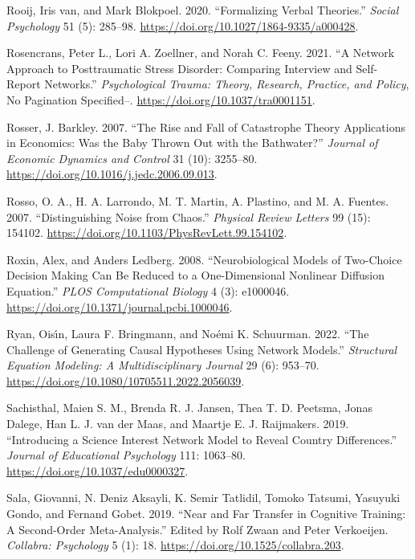 \documentclass[
  a4paper,
  DIV=11,
  numbers=noendperiod,
  oneside]{scrreprt}
\newlength{\cslhangindent}
\newenvironment{CSLReferences}[2] %
 {\begin{list}{}{%
  \setlength{\itemindent}{0pt}
  \setlength{\leftmargin}{0pt}
  \setlength{\parsep}{0pt}
  \ifodd #1
   \setlength{\leftmargin}{\cslhangindent}
   \setlength{\itemindent}{-1\cslhangindent}
  \fi
  \setlength{\itemsep}{#2\baselineskip}}}
 {\end{list}}
\begin{document}
\begin{CSLReferences}{1}{0}
Rooij, Iris van, and Mark Blokpoel. 2020. {``Formalizing Verbal
Theories.''} \emph{Social Psychology} 51 (5): 285--98.
\url{https://doi.org/10.1027/1864-9335/a000428}.

Rosencrans, Peter L., Lori A. Zoellner, and Norah C. Feeny. 2021. {``A
Network Approach to Posttraumatic Stress Disorder: {Comparing} Interview
and Self-Report Networks.''} \emph{Psychological Trauma: Theory,
Research, Practice, and Policy}, No Pagination Specified--.
\url{https://doi.org/10.1037/tra0001151}.

Rosser, J. Barkley. 2007. {``The Rise and Fall of Catastrophe Theory
Applications in Economics: {Was} the Baby Thrown Out with the
Bathwater?''} \emph{Journal of Economic Dynamics and Control} 31 (10):
3255--80. \url{https://doi.org/10.1016/j.jedc.2006.09.013}.

Rosso, O. A., H. A. Larrondo, M. T. Martin, A. Plastino, and M. A.
Fuentes. 2007. {``Distinguishing Noise from Chaos.''} \emph{Physical
Review Letters} 99 (15): 154102.
\url{https://doi.org/10.1103/PhysRevLett.99.154102}.

Roxin, Alex, and Anders Ledberg. 2008. {``Neurobiological {Models} of
{Two-Choice Decision Making Can Be Reduced} to a {One-Dimensional
Nonlinear Diffusion Equation}.''} \emph{PLOS Computational Biology} 4
(3): e1000046. \url{https://doi.org/10.1371/journal.pcbi.1000046}.

Ryan, Oisı́n, Laura F. Bringmann, and Noémi K. Schuurman. 2022. {``The
{Challenge} of {Generating Causal Hypotheses Using Network Models}.''}
\emph{Structural Equation Modeling: A Multidisciplinary Journal} 29 (6):
953--70. \url{https://doi.org/10.1080/10705511.2022.2056039}.

Sachisthal, Maien S. M., Brenda R. J. Jansen, Thea T. D. Peetsma, Jonas
Dalege, Han L. J. van der Maas, and Maartje E. J. Raijmakers. 2019.
{``Introducing a Science Interest Network Model to Reveal Country
Differences.''} \emph{Journal of Educational Psychology} 111: 1063--80.
\url{https://doi.org/10.1037/edu0000327}.

Sala, Giovanni, N. Deniz Aksayli, K. Semir Tatlidil, Tomoko Tatsumi,
Yasuyuki Gondo, and Fernand Gobet. 2019. {``Near and {Far Transfer} in
{Cognitive Training}: {A Second-Order Meta-Analysis}.''} Edited by Rolf
Zwaan and Peter Verkoeijen. \emph{Collabra: Psychology} 5 (1): 18.
\url{https://doi.org/10.1525/collabra.203}.


\end{CSLReferences}
\end{document}
